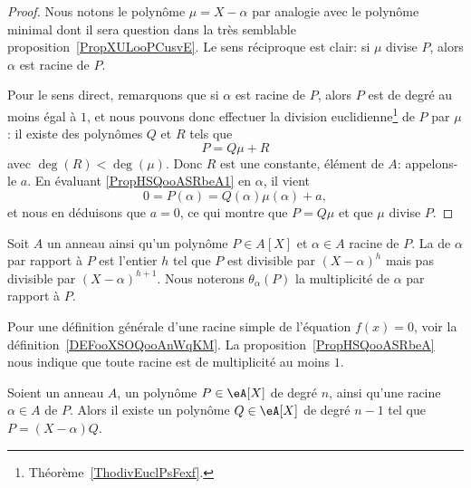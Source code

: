 \begin{proof}
  Nous notons le polynôme \( \mu=X-\alpha\) par analogie avec le polynôme minimal dont il sera question dans la très semblable proposition~\ref{PropXULooPCusvE}. Le sens réciproque est clair: si $\mu$ divise $P$, alors $\alpha$ est racine de $P$.

  Pour le sens direct, remarquons que si $\alpha$ est racine de $P$, alors $P$ est de degré au moins égal à \( 1\), et nous pouvons donc effectuer la division euclidienne\footnote{Théorème~\ref{ThodivEuclPsFexf}.} de \( P\) par \( \mu\) : il existe des polynômes \( Q\) et \( R\) tels que
    \begin{equation} \label{PropHSQooASRbeA1}
        P=Q\mu+R
    \end{equation}
    avec \( \deg(R)<\deg(\mu)\). Donc \( R\) est une constante,
    élément de $A$: appelons-le $a$. En évaluant
    \eqref{PropHSQooASRbeA1} en \( \alpha\), il vient
    \begin{equation}
        0 = P(\alpha)=Q(\alpha)\mu(\alpha)+a,
    \end{equation}
    et nous en déduisons que \( a=0\), ce qui montre que \( P=Q\mu\) et que \( \mu\) divise \( P\).
\end{proof}

\begin{definition}
  Soit \( A\) un anneau ainsi qu'un polynôme \( P\in A[X]\) et \( \alpha\in A\) racine de $P$. La  de \( \alpha\) par rapport à \( P\) est l'entier \( h\) tel que \( P\) est divisible par \( (X-\alpha)^h\) mais pas divisible par \( (X-\alpha)^{h+1}\).  Nous noterons \( \theta_{\alpha}(P)\) la multiplicité de \( \alpha\) par rapport à \( P\).
\end{definition}

\begin{normaltext}
    Pour une définition générale d'une racine simple de l'équation \( f(x)=0\), voir la définition~\ref{DEFooXSOQooAnWqKM}. La proposition~\ref{PropHSQooASRbeA} nous indique que toute racine est de multiplicité au moins \( 1\).
\end{normaltext}

\begin{proposition}     \label{PROPooQCZSooVokxXQ}
    Soient un anneau \( A\), un polynôme \( P\in \eA[X]\) de degré \( n\), ainsi qu'une racine \( \alpha\in A\) de \( P\). Alors il existe un polynôme \( Q\in \eA[X]\) de degré \( n-1\) tel que \( P=(X-\alpha)Q\).
\end{proposition}



